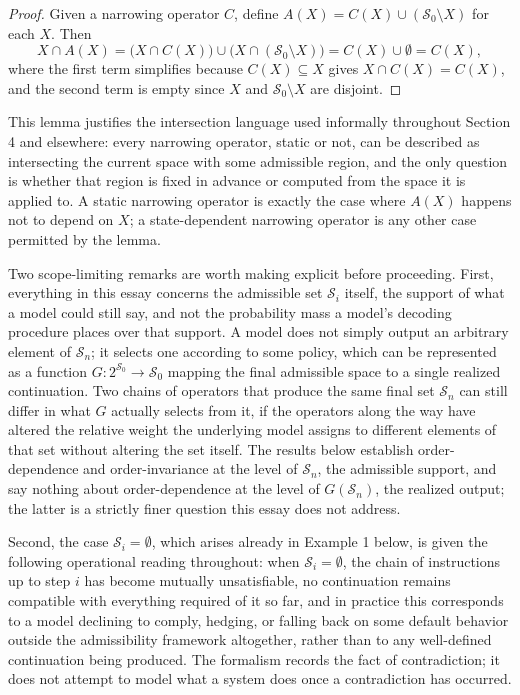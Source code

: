 \documentclass[11pt]{article}
\begin{document}
\begin{proof}
Given a narrowing operator $C$, define $A(X) = C(X) \cup (\mathcal{S}_0 \setminus X)$ for each $X$. Then
\[
X \cap A(X) = \big(X \cap C(X)\big) \cup \big(X \cap (\mathcal{S}_0 \setminus X)\big) = C(X) \cup \emptyset = C(X),
\]
where the first term simplifies because $C(X) \subseteq X$ gives $X \cap C(X) = C(X)$, and the second term is empty since $X$ and $\mathcal{S}_0 \setminus X$ are disjoint.
\end{proof}

This lemma justifies the intersection language used informally throughout Section 4 and elsewhere: every narrowing operator, static or not, can be described as intersecting the current space with some admissible region, and the only question is whether that region is fixed in advance or computed from the space it is applied to. A static narrowing operator is exactly the case where $A(X)$ happens not to depend on $X$; a state-dependent narrowing operator is any other case permitted by the lemma.

Two scope-limiting remarks are worth making explicit before proceeding. First, everything in this essay concerns the admissible set $\mathcal{S}_i$ itself, the support of what a model could still say, and not the probability mass a model's decoding procedure places over that support. A model does not simply output an arbitrary element of $\mathcal{S}_n$; it selects one according to some policy, which can be represented as a function $G : 2^{\mathcal{S}_0} \to \mathcal{S}_0$ mapping the final admissible space to a single realized continuation. Two chains of operators that produce the same final set $\mathcal{S}_n$ can still differ in what $G$ actually selects from it, if the operators along the way have altered the relative weight the underlying model assigns to different elements of that set without altering the set itself. The results below establish order-dependence and order-invariance at the level of $\mathcal{S}_n$, the admissible support, and say nothing about order-dependence at the level of $G(\mathcal{S}_n)$, the realized output; the latter is a strictly finer question this essay does not address.

Second, the case $\mathcal{S}_i = \emptyset$, which arises already in Example 1 below, is given the following operational reading throughout: when $\mathcal{S}_i = \emptyset$, the chain of instructions up to step $i$ has become mutually unsatisfiable, no continuation remains compatible with everything required of it so far, and in practice this corresponds to a model declining to comply, hedging, or falling back on some default behavior outside the admissibility framework altogether, rather than to any well-defined continuation being produced. The formalism records the fact of contradiction; it does not attempt to model what a system does once a contradiction has occurred.
\end{document}
